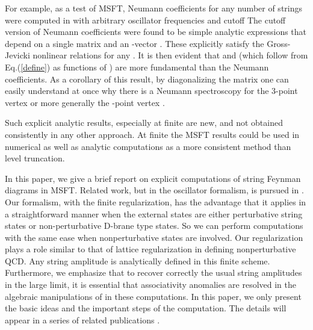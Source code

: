 \documentclass[a4paper,11pt]{article}
\begin{document}
For example, as a test of MSFT, Neumann coefficients for any number of
strings were computed in \cite{BM2} with arbitrary oscillator frequencies \coordHE{} and cutoff \coordHE{} The cutoff version of Neumann coefficients \coordHE{} were found to be simple analytic expressions that depend on a
single \coordHE{} matrix \coordHE{}
and an \coordHE{}-vector \coordHE{}. These explicitly satisfy the Gross-Jevicki nonlinear
relations for any \coordHE{} \cite{BM2}. It is then evident that \coordHE{}
and \coordHE{} (which follow from Eq.(\ref{define}) as functions of \myHighlight{$\kappa $}\coordHE{}) are
more fundamental than the Neumann coefficients. As a corollary of this
result, by diagonalizing the matrix \coordHE{} \cite{BM2} one can easily understand
at once why there is a Neumann spectroscopy for the 3-point vertex \cite%
{spectroscopy} or more generally the \coordHE{}-point vertex \cite{BM2}.

Such explicit analytic results, especially at finite \coordHE{} are new, and not
obtained consistently in any other approach. At finite \coordHE{} the MSFT results
could be used in numerical as well as analytic computations as a more
consistent method than level truncation.

In this paper, we give a brief report on explicit computations of string
Feynman diagrams in MSFT. Related work, but in the oscillator formalism, is
pursued in \cite{Taylor}. Our formalism, with the finite \coordHE{} regularization,
has the advantage that it applies in a straightforward manner when the
external states are either perturbative string states or non-perturbative
D-brane type states. So we can perform computations with the same ease when
nonperturbative states are involved. Our regularization plays a role similar
to that of lattice regularization in defining nonperturbative QCD. Any
string amplitude is analytically defined in this finite scheme. Furthermore,
we emphasize that to recover correctly the usual string amplitudes in the
large \coordHE{} limit, it is essential that associativity anomalies are resolved
in the algebraic manipulations of \coordHE{} in these computations\myHighlight{$^{\ref%
{anom}}$}\coordHE{}. In this paper, we only present the basic ideas and the important
steps of the computation. The details will appear in a series of related
publications \cite{PREP}.
\end{document}
